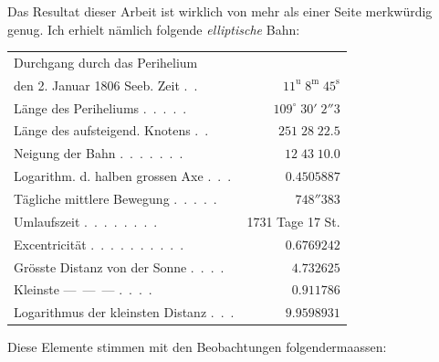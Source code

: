 \par\indent Das Resultat dieser Arbeit ist wirklich von mehr als einer Seite merkwürdig genug. Ich erhielt
nämlich folgende \emph{elliptische} Bahn:

\begin{center}\begingroup
\fontsize{9}{11}\selectfont
\setlength{\tabcolsep}{2pt}\renewcommand{\arraystretch}{1.12}
\begin{tabular}{lr}
\multicolumn{2}{l}{Durchgang durch das Perihelium} \\
\quad den 2. Januar 1806 Seeb. Zeit .\ . & $11^{\mathrm{u}}\;8^{\mathrm{m}}\;45^{\mathrm{s}}$ \\
Länge des Periheliums .\ .\ .\ .\ . & $109^\circ\;30'\;2''3$ \\
Länge des aufsteigend. Knotens .\ . & $251\;28\;22.5$ \\
Neigung der Bahn .\ .\ .\ .\ .\ .\ . & $12\;43\;10.0$ \\
Logarithm. d. halben grossen Axe .\ .\ . & $0.4505887$ \\
Tägliche mittlere Bewegung .\ .\ .\ .\ . & $748''383$ \\
Umlaufszeit .\ .\ .\ .\ .\ .\ .\ . & 1731 Tage 17 St. \\
Excentricität .\ .\ .\ .\ .\ .\ .\ .\ .\ . & $0.6769242$ \\
Grösste Distanz von der Sonne .\ .\ .\ . & $4.732625$ \\
Kleinste \quad---\ ---\ --- .\ .\ .\ . & $0.911786$ \\
Logarithmus der kleinsten Distanz .\ .\ . & $9.9598931$ \\
\end{tabular}\endgroup\end{center}

\par\indent Diese Elemente stimmen mit den Beobachtungen folgendermaassen:

